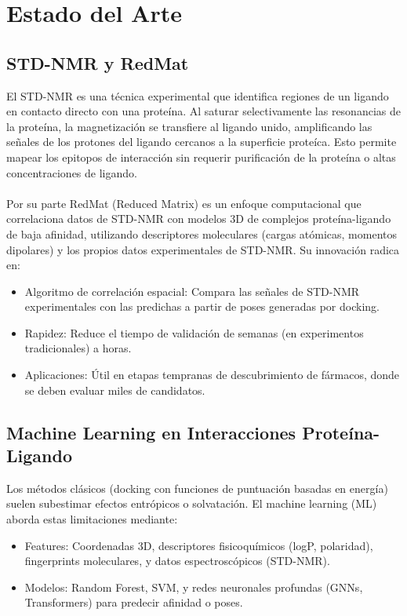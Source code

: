 \documentclass{article}
\begin{document}
\newpage

\section{Estado del Arte}

\subsection{STD-NMR y RedMat}
El STD-NMR es una técnica experimental que identifica regiones de un ligando en contacto directo con una proteína. Al saturar selectivamente las resonancias de la proteína,
la magnetización se transfiere al ligando unido, amplificando las señales de los protones del ligando cercanos a la superficie proteíca\cite{STD_e}. Esto permite mapear los epitopos
de interacción sin requerir purificación de la proteína o altas concentraciones de ligando.
\\
\\
Por su parte RedMat (Reduced Matrix) es un enfoque computacional que correlaciona datos de STD-NMR con modelos 3D de complejos proteína-ligando de baja afinidad, utilizando
descriptores moleculares (cargas atómicas, momentos dipolares) y los propios datos experimentales de STD-NMR. Su innovación radica en:
\begin{itemize}
    \item Algoritmo de correlación espacial: Compara las señales de STD-NMR experimentales con las predichas a partir de poses generadas por docking.
    \item Rapidez: Reduce el tiempo de validación de semanas (en experimentos tradicionales) a horas.
    \item Aplicaciones: Útil en etapas tempranas de descubrimiento de fármacos, donde se deben evaluar miles de candidatos.
\end{itemize}

\subsection{Machine Learning en Interacciones Proteína-Ligando}

Los métodos clásicos (docking con funciones de puntuación basadas en energía) suelen subestimar efectos entrópicos o solvatación. El machine learning (ML) aborda
estas limitaciones mediante:
\begin{itemize}
    \item Features: Coordenadas 3D, descriptores fisicoquímicos (logP, polaridad), fingerprints moleculares, y datos espectroscópicos (STD-NMR).
    \item Modelos: Random Forest, SVM, y redes neuronales profundas (GNNs, Transformers) para predecir afinidad o poses\cite{rf_score}.
\end{itemize}
\end{document}

